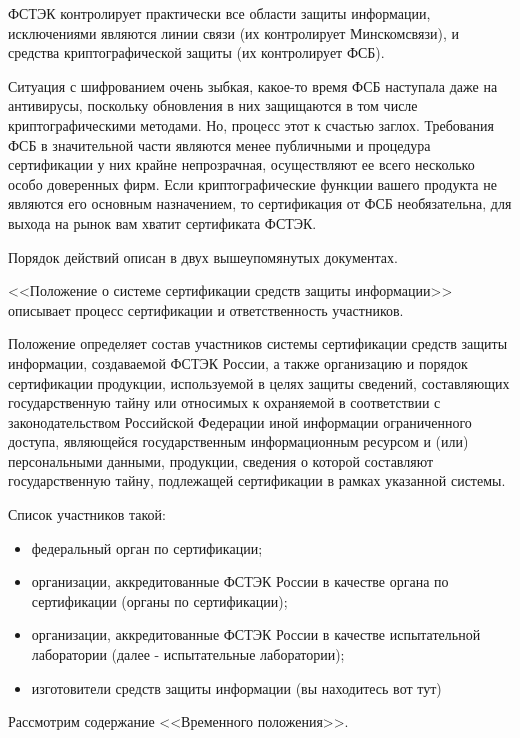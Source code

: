 ФСТЭК контролирует практически все области защиты информации, исключениями являются линии связи (их контролирует Минскомсвязи), и средства криптографической защиты (их контролирует ФСБ).

Ситуация с шифрованием очень зыбкая, какое-то время ФСБ наступала даже на антивирусы, поскольку обновления в них защищаются в том числе криптографическими методами. Но, процесс этот к счастью заглох. Требования ФСБ в значительной части являются менее публичными и процедура сертификации у них крайне непрозрачная, осуществляют ее всего несколько особо доверенных фирм. Если криптографические функции вашего продукта не являются его основным назначением, то сертификация от ФСБ необязательна, для выхода на рынок вам хватит сертификата ФСТЭК.

Порядок действий описан в двух вышеупомянутых документах.

<<Положение о системе сертификации средств защиты информации>> описывает процесс сертификации и ответственность участников.

Положение определяет состав участников системы сертификации средств защиты информации, создаваемой ФСТЭК России, а также организацию и порядок сертификации продукции, используемой в целях защиты сведений, составляющих государственную тайну или относимых к охраняемой в соответствии с законодательством Российской Федерации иной информации ограниченного доступа, являющейся государственным информационным ресурсом и (или) персональными данными, продукции, сведения о которой составляют государственную тайну, подлежащей сертификации в рамках указанной системы.

Список участников такой:
\begin{itemize}
    \item федеральный орган по сертификации;
    \item организации, аккредитованные ФСТЭК России в качестве органа по сертификации (органы по сертификации);
    \item организации, аккредитованные ФСТЭК России в качестве испытательной лаборатории (далее - испытательные лаборатории);
    \item изготовители средств защиты информации (вы находитесь вот тут)
\end{itemize}
Рассмотрим содержание <<Временного положения>>.


